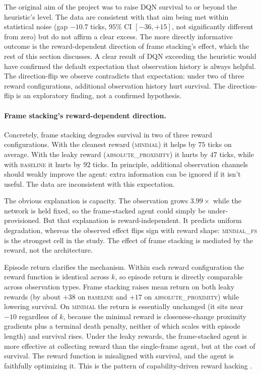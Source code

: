 \documentclass[12pt,a4paper,titlepage]{article}
\begin{document}
The original aim of the project was to raise DQN survival to or beyond the heuristic's level. The data are consistent with that aim being met within statistical noise (gap $-10.7$ ticks, $95\%$ CI $[-36, +15]$, not significantly different from zero) but do not affirm a clear excess. The more directly informative outcome is the reward-dependent direction of frame stacking's effect, which the rest of this section discusses. A clear result of DQN exceeding the heuristic would have confirmed the default expectation that observation history is always helpful. The direction-flip we observe contradicts that expectation: under two of three reward configurations, additional observation history hurt survival. The direction-flip is an exploratory finding, not a confirmed hypothesis.

\paragraph{Frame stacking's reward-dependent direction.}
Concretely, frame stacking degrades survival in two of three reward configurations. With the cleanest reward (\textsc{minimal}) it helps by $75$ ticks on average. With the leaky reward (\textsc{absolute\_proximity}) it hurts by $47$ ticks, while with \textsc{baseline} it hurts by $92$ ticks. In principle, additional observation channels should weakly improve the agent: extra information can be ignored if it isn't useful. The data are inconsistent with this expectation.

The obvious explanation is capacity. The observation grows $3.99\times$ while the network is held fixed, so the frame-stacked agent could simply be under-provisioned. But that explanation is reward-independent. It predicts uniform degradation, whereas the observed effect flips sign with reward shape: \textsc{minimal\_fs} is the strongest cell in the study. The effect of frame stacking is mediated by the reward, not the architecture.

Episode return clarifies the mechanism. Within each reward configuration the reward function is identical across $k$, so episode return is directly comparable across observation types. Frame stacking raises mean return on both leaky rewards (by about $+38$ on \textsc{baseline} and $+17$ on \textsc{absolute\_proximity}) while lowering survival. On \textsc{minimal} the return is essentially unchanged (it sits near $-10$ regardless of $k$, because the minimal reward is closeness-change proximity gradients plus a terminal death penalty, neither of which scales with episode length) and survival rises. Under the leaky rewards, the frame-stacked agent is more effective at collecting reward than the single-frame agent, but at the cost of survival. The reward function is misaligned with survival, and the agent is faithfully optimizing it. This is the pattern of capability-driven reward hacking \citep{Pan2022}.
\end{document}
